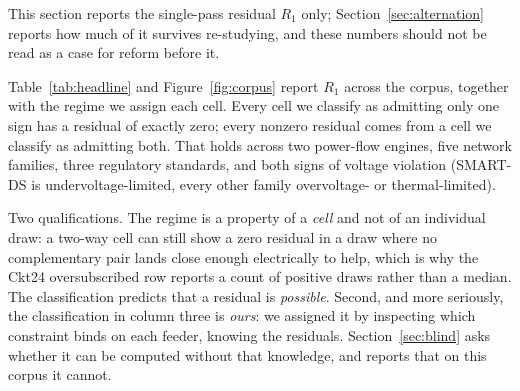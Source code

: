 \documentclass[review,authoryear,12pt]{elsarticle}
\begin{document}
This section reports the single-pass residual $R_{1}$ only;
Section~\ref{sec:alternation} reports how much of it survives re-studying, and
these numbers should not be read as a case for reform before it.

Table~\ref{tab:headline} and Figure~\ref{fig:corpus} report $R_{1}$
across the corpus, together with the regime we assign each cell. Every cell we
classify as admitting only one sign has a residual of exactly zero; every
nonzero residual comes from a cell we classify as admitting both. That holds
across two power-flow engines, five network families, three regulatory
standards, and both signs of voltage violation (SMART-DS is
undervoltage-limited, every other family overvoltage- or thermal-limited).

Two qualifications. The regime is a property of a \emph{cell} and not of
an individual draw: a two-way cell can still show a zero residual in a draw
where no complementary pair lands close enough electrically to help, which is
why the Ckt24 oversubscribed row reports a count of positive draws rather than
a median. The classification predicts that a residual is \emph{possible}.
Second, and more seriously, the classification in
column three is \emph{ours}: we assigned it by inspecting which constraint
binds on each feeder, knowing the residuals. Section~\ref{sec:blind} asks
whether it can be computed without that knowledge, and reports that on this
corpus it cannot.
\end{document}
